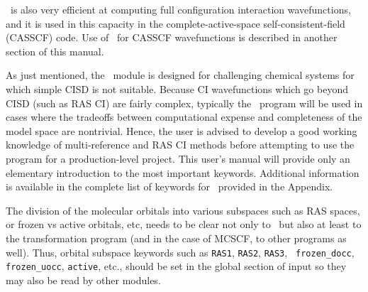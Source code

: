 \PSIdetci\ is also very efficient at computing full configuration interaction
wavefunctions, and it is used in this capacity in the complete-active-space
self-consistent-field (CASSCF) code.  Use of \PSIdetci\ for CASSCF
wavefunctions is described in another section of this manual.

As just mentioned, the \PSIdetci\ module is designed for challenging 
chemical systems for which simple CISD is not suitable.  Because
CI wavefunctions which go beyond CISD (such as RAS CI) are fairly complex,
typically the \PSIdetci\ program will be used in cases where the 
tradeoffs between computational expense and completeness of the 
model space are nontrivial.  Hence, the user is advised to develop
a good working knowledge of multi-reference and RAS CI methods before
attempting to use the program for a production-level project.  This user's
manual will provide only an elementary introduction to the most
important keywords.  Additional information is available in the complete
list of keywords for \PSIdetci\ provided in the Appendix.

The division of the molecular orbitals into various subspaces such as
RAS spaces, or frozen vs active orbitals, etc, needs to be clear not
only to \PSIdetci\, but also at least to the transformation program
(and in the case of MCSCF, to other programs as well).  Thus, orbital
subspace keywords such as {\tt RAS1}, {\tt RAS2}, {\tt RAS3}, {\tt
frozen\_docc}, {\tt frozen\_uocc}, {\tt active}, etc., should be set
in the global section of input so they may also be read by other modules.

